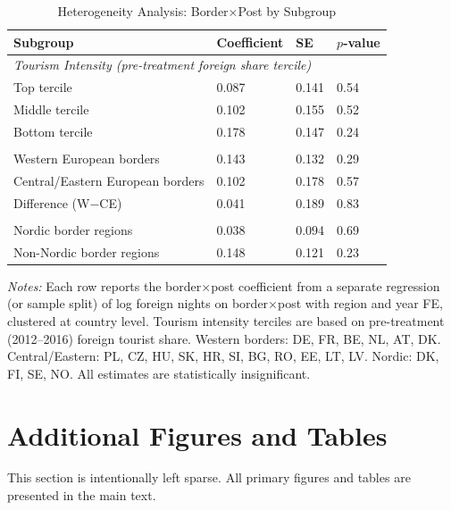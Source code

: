 \documentclass[12pt]{article}
\begin{document}
\begin{table}[htbp]
\caption{\label{tab:heterogeneity}Heterogeneity Analysis: Border$\times$Post by Subgroup}
\centering
\begin{tabular}{llll}
\toprule
Subgroup & Coefficient & SE & $p$-value \\
\midrule
\multicolumn{4}{l}{\textit{Tourism Intensity (pre-treatment foreign share tercile)}} \\
\quad Top tercile & 0.087 & 0.141 & 0.54 \\
\quad Middle tercile & 0.102 & 0.155 & 0.52 \\
\quad Bottom tercile & 0.178 & 0.147 & 0.24 \\
\addlinespace
\multicolumn{4}{l}{\textit{Border Corridor}} \\
\quad Western European borders & 0.143 & 0.132 & 0.29 \\
\quad Central/Eastern European borders & 0.102 & 0.178 & 0.57 \\
\quad Difference (W$-$CE) & 0.041 & 0.189 & 0.83 \\
\addlinespace
\multicolumn{4}{l}{\textit{Nordic Pre-Agreements}} \\
\quad Nordic border regions & 0.038 & 0.094 & 0.69 \\
\quad Non-Nordic border regions & 0.148 & 0.121 & 0.23 \\
\bottomrule
\end{tabular}
\vspace{0.3em}

\parbox{0.95\textwidth}{\footnotesize \textit{Notes:} Each row reports the border$\times$post coefficient from a separate regression (or sample split) of log foreign nights on border$\times$post with region and year FE, clustered at country level. Tourism intensity terciles are based on pre-treatment (2012--2016) foreign tourist share. Western borders: DE, FR, BE, NL, AT, DK. Central/Eastern: PL, CZ, HU, SK, HR, SI, BG, RO, EE, LT, LV. Nordic: DK, FI, SE, NO. All estimates are statistically insignificant.}
\end{table}


\section{Additional Figures and Tables}

This section is intentionally left sparse. All primary figures and tables are presented in the main text.
\end{document}
